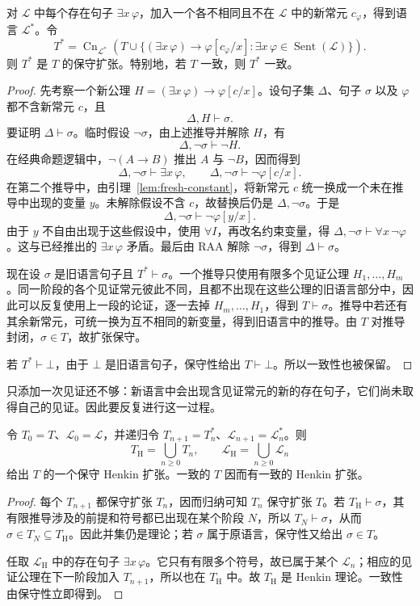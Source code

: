 \documentclass[lang=cn,a4paper,fontset=none,zihao=false,10pt,openany,twoside]{beautybook}
\numberwithin{algorithm}{chapter}
\begin{document}
\Needspace{48mm}
\begin{lemma}[添加见证的保守性]\label{lem:henkin-conservative}
对 $\mathcal L$ 中每个存在句子 $\exists x\,\varphi$，加入一个各不相同且不在 $\mathcal L$ 中的新常元 $c_\varphi$，得到语言 $\mathcal L^*$。令
\[
 T^*=\operatorname{Cn}_{\mathcal L^*}\!\left(
 T\cup\{(\exists x\,\varphi)\to\varphi[c_\varphi/x]:
               \exists x\,\varphi\in\operatorname{Sent}(\mathcal L)\}\right).
\]
则 $T^*$ 是 $T$ 的保守扩张。特别地，若 $T$ 一致，则 $T^*$ 一致。
\end{lemma}
\begin{proof}
先考察一个新公理 $H=(\exists x\,\varphi)\to\varphi[c/x]$。设句子集 $\Delta$、句子 $\sigma$ 以及 $\varphi$ 都不含新常元 $c$，且
\[
 \Delta,H\vdash\sigma.
\]
要证明 $\Delta\vdash\sigma$。临时假设 $\neg\sigma$，由上述推导并解除 $H$，有
\[
 \Delta,\neg\sigma\vdash\neg H.
\]
在经典命题逻辑中，$\neg(A\to B)$ 推出 $A$ 与 $\neg B$，因而得到
\[
 \Delta,\neg\sigma\vdash\exists x\,\varphi,
 \qquad
 \Delta,\neg\sigma\vdash\neg\varphi[c/x].
\]
在第二个推导中，由引理~\ref{lem:fresh-constant}，将新常元 $c$ 统一换成一个未在推导中出现的变量 $y$。未解除假设不含 $c$，故替换后仍是 $\Delta,\neg\sigma$。于是
\[
 \Delta,\neg\sigma\vdash\neg\varphi[y/x].
\]
由于 $y$ 不自由出现于这些假设中，使用 $\forall I$，再改名约束变量，得 $\Delta,\neg\sigma\vdash\forall x\,\neg\varphi$。这与已经推出的 $\exists x\,\varphi$ 矛盾。最后由 RAA 解除 $\neg\sigma$，得到 $\Delta\vdash\sigma$。

现在设 $\sigma$ 是旧语言句子且 $T^*\vdash\sigma$。一个推导只使用有限多个见证公理 $H_1,\ldots,H_m$。同一阶段的各个见证常元彼此不同，且都不出现在这些公理的旧语言部分中，因此可以反复使用上一段的论证，逐一去掉 $H_m,\ldots,H_1$，得到 $T\vdash\sigma$。推导中若还有其余新常元，可统一换为互不相同的新变量，得到旧语言中的推导。由 $T$ 对推导封闭，$\sigma\in T$，故扩张保守。

若 $T^*\vdash\bot$，由于 $\bot$ 是旧语言句子，保守性给出 $T\vdash\bot$。所以一致性也被保留。
\end{proof}

只添加一次见证还不够：新语言中会出现含见证常元的新的存在句子，它们尚未取得自己的见证。因此要反复进行这一过程。
\begin{lemma}[Henkin 扩张]\label{lem:henkin-extension}
令 $T_0=T$、$\mathcal L_0=\mathcal L$，并递归令 $T_{n+1}=T_n^*$、$\mathcal L_{n+1}=\mathcal L_n^*$。则
\[
 T_{\mathrm H}=\bigcup_{n\ge0}T_n,
 \qquad \mathcal L_{\mathrm H}=\bigcup_{n\ge0}\mathcal L_n
\]
给出 $T$ 的一个保守 Henkin 扩张。一致的 $T$ 因而有一致的 Henkin 扩张。
\end{lemma}
\begin{proof}
每个 $T_{n+1}$ 都保守扩张 $T_n$，因而归纳可知 $T_n$ 保守扩张 $T$。若 $T_{\mathrm H}\vdash\sigma$，其有限推导涉及的前提和符号都已出现在某个阶段 $N$，所以 $T_N\vdash\sigma$，从而 $\sigma\in T_N\subseteq T_{\mathrm H}$。因此并集仍是理论；若 $\sigma$ 属于原语言，保守性又给出 $\sigma\in T$。

任取 $\mathcal L_{\mathrm H}$ 中的存在句子 $\exists x\,\varphi$。它只有有限多个符号，故已属于某个 $\mathcal L_n$；相应的见证公理在下一阶段加入 $T_{n+1}$，所以也在 $T_{\mathrm H}$ 中。故 $T_{\mathrm H}$ 是 Henkin 理论。一致性由保守性立即得到。
\end{proof}
\end{document}
